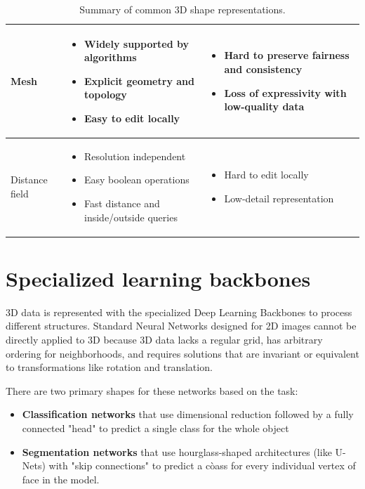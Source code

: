 \begin{table}[ht]
\begin{tabularx}{\textwidth}{|p{2.5cm}|X|X|}
Mesh &
\begin{itemize}[leftmargin=*,nosep]
    \item Widely supported by algorithms
    \item Explicit geometry and topology
    \item Easy to edit locally
\end{itemize}
&
\begin{itemize}[leftmargin=*,nosep]
    \item Hard to preserve fairness and consistency
    \item Loss of expressivity with low-quality data
\end{itemize}
\\
\hline

Distance field &
\begin{itemize}[leftmargin=*,nosep]
    \item Resolution independent
    \item Easy boolean operations
    \item Fast distance and inside/outside queries
\end{itemize}
&
\begin{itemize}[leftmargin=*,nosep]
    \item Hard to edit locally
    \item Low-detail representation
\end{itemize}
\\
\hline

\end{tabularx}

\caption{Summary of common 3D shape representations.}
\label{tab:19.1}
\end{table}

\section{Specialized learning backbones}
3D data is represented with the specialized Deep Learning Backbones to process different structures. Standard Neural Networks designed for 2D images cannot be directly applied to 3D because 3D data lacks a regular grid, has arbitrary ordering for neighborhoods, and requires solutions that are invariant or equivalent to transformations like rotation and translation.\par
There are two primary shapes for these networks based on the task:
\begin{itemize}[noitemsep]
    \item \textbf{Classification networks} that use dimensional reduction followed by a fully connected "head" to predict a single class for the whole object
    \item \textbf{Segmentation networks} that use hourglass-shaped architectures (like U-Nets) with "skip connections" to predict a còass for every individual vertex of face in the model.
\end{itemize}

